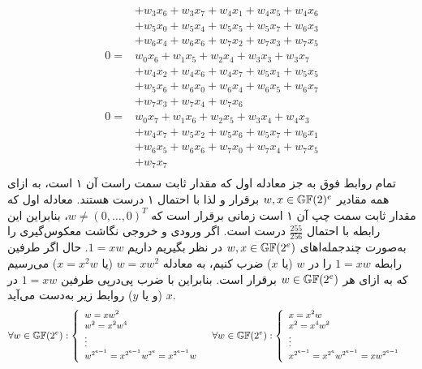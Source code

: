\begin{equation*}
{\begin{split}
	&+ w_{3} x_{6} + w_{3} x_{7} + w_{4} x_{1} + w_{4} x_{5} + w_{4} x_{6}\\
	&+ w_{5} x_{0} + w_{5} x_{4} + w_{5} x_{5} + w_{5} x_{7} + w_{6} x_{3}\\
	&+ w_{6} x_{4} + w_{6} x_{6} + w_{7} x_{2} + w_{7} x_{3} + w_{7} x_{5}\\
	0 =& w_{0} x_{6} + w_{1} x_{5} + w_{2} x_{4} + w_{3} x_{3} + w_{3} x_{7}\\
	&+w_{4} x_{2} + w_{4} x_{6} + w_{4} x_{7} + w_{5} x_{1} + w_{5} x_{5}\\
	&+w_{5} x_{6} + w_{6} x_{0} + w_{6} x_{4} + w_{6} x_{5} + w_{6} x_{7}\\
	&+w_{7} x_{3} + w_{7} x_{4} + w_{7} x_{6}\\
	0 =& w_{0} x_{7} + w_{1} x_{6} + w_{2} x_{5} + w_{3} x_{4} + w_{4} x_{3}\\
	&+w_{4} x_{7} + w_{5} x_{2} + w_{5} x_{6} + w_{5} x_{7} + w_{6} x_{1}\\
	&+w_{6} x_{5} + w_{6} x_{6} + w_{7} x_{0} + w_{7} x_{4} + w_{7} x_{5}\\
	&+w_{7} x_{7}\\
	\end{split}}
\end{equation*}
تمام روابط فوق به جز معادله اول که مقدار ثابت سمت راست آن ۱ است، به ازای همه مقادیر 
$w, x\in\mathbb{GF}(2)^{e}$
برقرار و لذا با احتمال ۱ درست هستند. معادله اول که مقدار ثابت سمت چپ آن ۱ است زمانی برقرار است که 
$w \neq (0,\ldots,0)^{T}$، 
بنابراین این رابطه با احتمال 
$\frac{255}{256}$
درست است. اگر ورودی و خروجی نگاشت معکوس‌گیری را به‌صورت چندجمله‌ا‌های 
$w, x\in \mathbb{GF}(2^{e})$
در نظر بگیریم داریم 
$1 = xw$. 
حال اگر طرفین رابطه 
$1 = xw$
را در 
$w$
(یا 
$x$)
ضرب کنیم، به معادله 
$w = xw^{2}$
(یا 
$x = x^{2}w$)
می‌رسیم که به ازای هر 
$w\in\mathbb{GF}(2^{e})$
برقرار است. بنابراین   با ضرب پی‌درپی طرفین 
$1 = xw$
در 
$x$
(و یا  
$y$)
روابط زیر به‌دست می‌آید.
\begin{align*}
{\small \forall w\in \mathbb{GF}(2^{e}) : \left \{ \begin{array}{l}
w = xw^{2}\\
w^{2} = x^{2}w^{4}\\
\vdots\\
w^{2^{e-1}} = x^{2^{e-1}}w^{2^{e}} = x^{2^{e-1}}w\\
\end{array} \right.}
&
\quad
{\small\forall w\in \mathbb{GF}(2^{e}) : \left \{ \begin{array}{l}
x = x^{2}w\\
x^{2} = x^{4}w^{2}\\
\vdots\\
x^{2^{e-1}} = x^{2^{e}}w^{2^{e-1}} = xw^{2^{e-1}}
\end{array} \right.}
\end{align*} 
